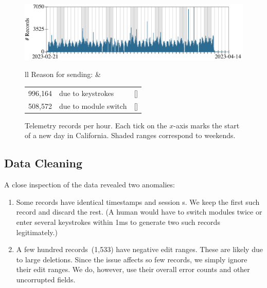\documentclass[english,submission,cleveref]{programming}
\begin{document}
\begin{figure}[t]\centering
  \includegraphics[width=\columnwidth]{img/row-distribution.pdf}
  \begin{tabular}{ll}
    Reason for sending:
    &
    \begin{tabular}[t]{r@{~~}l@{~~}r}
      996,164 & due to keystrokes  & [\pct{66.20}] \\
      508,572 & due to module switch & [\pct{33.80}]
    \end{tabular}
  \end{tabular}
  \caption{Telemetry records per hour. Each tick on the $x$-axis marks the start of a new day in California. Shaded ranges correspond to weekends.}
  \label{f:records-per-hour}
\end{figure}


\subsection{Data Cleaning}
\label{s:data-cleaning}

A close inspection of the data revealed two anomalies:
\begin{enumerate}
  \item
    Some records have identical timestamps and session \uid{}s.
    We keep the first such record and discard the rest.
    (A human would have to switch modules twice or enter several keystrokes
     within 1ms to generate two such records legitimately.)

   \item
     A few hundred records~(1,533) have negative edit ranges.
     These are likely due to large deletions.
     Since the issue affects so few records, we simply ignore
     their edit ranges. We do, however, use their overall error counts and other uncorrupted fields.

\end{enumerate}
\end{document}
